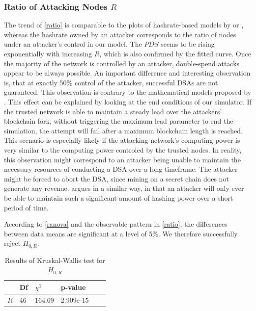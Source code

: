 \documentclass[a4paper,12pt,twoside]{report}
\begin{document}
\subsubsection{Ratio of Attacking Nodes $R$}
The trend of \autoref{ratio} is comparable to the plots of hashrate-based models by \cite{HBDSA} or \cite{DSAwithTime}, whereas the hashrate owned by an attacker corresponds to the ratio of nodes under an attacker's control in our model. The $PDS$ seems to be rising exponentially with increasing $R$, which is also confirmed by the fitted curve. Once the majority of the network is controlled by an attacker, double-spend attacks appear to be always possible. An important difference and interesting observation is, that at exactly 50\% control of the attacker, successful DSAs are not guaranteed. This observation is contrary to the mathematical models proposed by \cite{nakamoto2008bitcoin,HBDSA,DSAwithTime}. This effect can be explained by looking at the end conditions of our simulator. If the trusted network is able to maintain a steady lead over the attackers' blockchain fork, without triggering the maximum lead parameter to end the simulation, the attempt will fail after a maximum blockchain length is reached. This scenario is especially likely if the attacking network's computing power is very similar to the computing power controled by the trusted nodes. In reality, this observation might correspond to an attacker being unable to maintain the necessary resources of conducting a DSA over a long timeframe. The attacker might be forced to abort the DSA, since mining on a secret chain does not generate any revenue. \cite{longestchain} argues in a similar way, in that an attacker will only ever be able to maintain such a significant amount of hashing power over a short period of time. 

According to \autoref{ranova} and the observable pattern in \autoref{ratio}, the differences between data means are significant at a level of 5\%. We therefore successfully reject $H_{0,R}$.
\begin{table}[hb]
\centering
\begin{tabular}{|l|l|l|l|l|l|} \hline
& Df & $\chi^{2}$ & p-value \\ \hline
$R$ & 46 & 164.69 & 2.909e-15 \\ \hline
\end{tabular}
\caption{Results of Kruskal-Wallis test for $H_{0,R}$}
\label{ranova}
\end{table}
\end{document}
